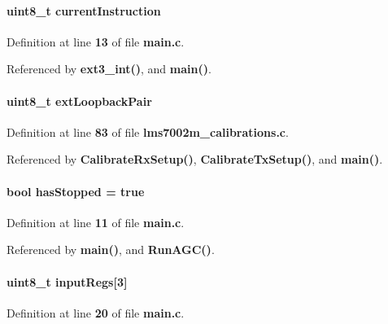 \paragraph[{current\+Instruction}]{\setlength{\rightskip}{0pt plus 5cm}uint8\+\_\+t current\+Instruction}\label{main_8c_a97aa663083e3fa5280b44e9760e3e6ba}


Definition at line {\bf 13} of file {\bf main.\+c}.



Referenced by {\bf ext3\+\_\+int()}, and {\bf main()}.

\paragraph[{ext\+Loopback\+Pair}]{\setlength{\rightskip}{0pt plus 5cm}uint8\+\_\+t ext\+Loopback\+Pair}\label{main_8c_ac7d7f1c9dac1f8b84d0997fdc4cbc5a4}


Definition at line {\bf 83} of file {\bf lms7002m\+\_\+calibrations.\+c}.



Referenced by {\bf Calibrate\+Rx\+Setup()}, {\bf Calibrate\+Tx\+Setup()}, and {\bf main()}.

\paragraph[{has\+Stopped}]{\setlength{\rightskip}{0pt plus 5cm}bool has\+Stopped = true}\label{main_8c_ac270116f25a6da3a3aca9b2d98ef648f}


Definition at line {\bf 11} of file {\bf main.\+c}.



Referenced by {\bf main()}, and {\bf Run\+A\+G\+C()}.

\paragraph[{input\+Regs}]{\setlength{\rightskip}{0pt plus 5cm}uint8\+\_\+t input\+Regs[3]}\label{main_8c_a638463ca1cb19dea2c9f09b5557cc864}


Definition at line {\bf 20} of file {\bf main.\+c}.



